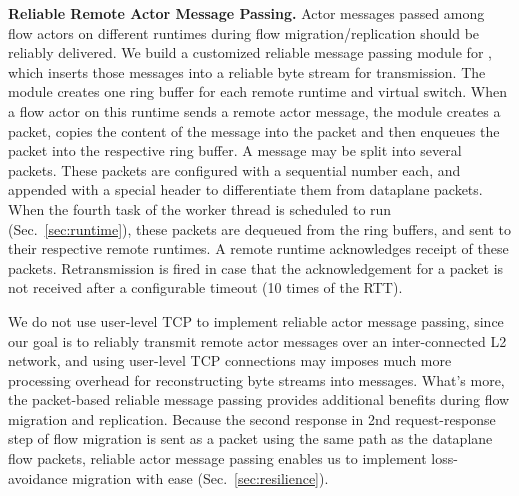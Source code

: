




\vspace{1mm}
\noindent \textbf{Reliable Remote Actor Message Passing.}
Actor messages passed among flow actors on different runtimes during flow migration/replication should be reliably delivered. We build a customized reliable message passing module for \nfactor, which inserts those messages into a reliable byte stream for transmission. %
The module creates one ring buffer for each remote runtime and virtual switch. When a flow actor on this runtime sends a remote actor message, the module creates a packet, copies the content of the message into the packet and then enqueues the packet into the respective ring buffer. A message may be split into several packets. %
These packets are configured with a sequential number each, and appended with a special header to differentiate them from dataplane packets.
 When the fourth task of the worker thread is scheduled to run (Sec.~\ref{sec:runtime}), these packets are dequeued from the ring buffers, and sent to their respective remote runtimes. A remote runtime acknowledges receipt of these packets. Retransmission is fired in case that the acknowledgement for a packet is not received after a configurable timeout (10 times of the RTT).

We do not use user-level TCP \cite{mtcp} to implement reliable actor message passing, since our goal is to reliably transmit remote actor messages over an inter-connected L2 network, and using user-level TCP connections may imposes much more processing overhead for reconstructing byte streams into messages.
What's more, the packet-based reliable message passing provides additional benefits during flow migration and replication. Because the second response in 2nd request-response step of flow migration is sent as a packet using the same path as the dataplane flow packets, reliable actor message passing enables us to implement loss-avoidance migration with ease (Sec.~\ref{sec:resilience}).

